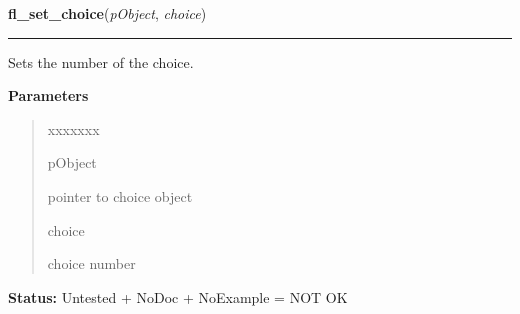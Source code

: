 \hspace{.8\funcindent}\begin{boxedminipage}{\funcwidth}

    \raggedright \textbf{fl\_set\_choice}(\textit{pObject}, \textit{choice})

    \vspace{-1.5ex}

    \rule{\textwidth}{0.5\fboxrule}
\setlength{\parskip}{2ex}
    Sets the number of the choice.

\setlength{\parskip}{1ex}
      \textbf{Parameters}
      \vspace{-1ex}

      \begin{quote}
        \begin{Ventry}{xxxxxxx}

          \item[pObject]

          pointer to choice object

          \item[choice]

          choice number

        \end{Ventry}

      \end{quote}

\textbf{Status:} Untested + NoDoc + NoExample = NOT OK



    \end{boxedminipage}

    \label{xformslib:library:fl_set_choice_text}

    \vspace{0.5ex}

